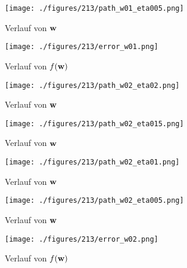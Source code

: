 \begin{figure}[h!]
  \centering
  \texttt{[image: ./figures/213/path\_w01\_eta005.png]}
  \caption{Verlauf von $\mathbf{w}$}
  \label{fig:213_path_w01_eta005}
\end{figure}

\begin{figure}[h!]
  \centering
  \texttt{[image: ./figures/213/error\_w01.png]}
  \caption{Verlauf von $f(\mathbf{w})$}
  \label{fig:213_error_w01}
\end{figure}

\begin{figure}[h!]
  \centering
  \texttt{[image: ./figures/213/path\_w02\_eta02.png]}
  \caption{Verlauf von $\mathbf{w}$}
  \label{fig:213_path_w02_eta02}
\end{figure}

\begin{figure}[h!]
  \centering
  \texttt{[image: ./figures/213/path\_w02\_eta015.png]}
  \caption{Verlauf von $\mathbf{w}$}
  \label{fig:213_path_w02_eta015}
\end{figure}

\begin{figure}[h!]
  \centering
  \texttt{[image: ./figures/213/path\_w02\_eta01.png]}
  \caption{Verlauf von $\mathbf{w}$}
  \label{fig:213_path_w02_eta01}
\end{figure}

\begin{figure}[h!]
  \centering
  \texttt{[image: ./figures/213/path\_w02\_eta005.png]}
  \caption{Verlauf von $\mathbf{w}$}
  \label{fig:213_path_w02_eta005}
\end{figure}

\begin{figure}[h!]
  \centering
  \texttt{[image: ./figures/213/error\_w02.png]}
  \caption{Verlauf von $f(\mathbf{w})$}
  \label{fig:213_error_w02}
\end{figure}

\clearpage

